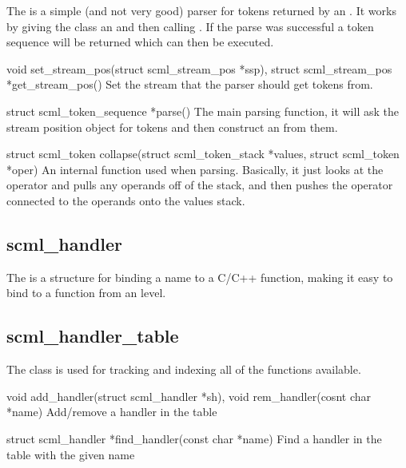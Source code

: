 The  is a simple (and not very good) parser for \SCML{} tokens
returned by an .  It works by giving the class an
 and then calling .  If the parse was
successful a token sequence will be returned which can then be executed.

\begin{cprototypelist}
  \item[void set_stream_pos(struct scml_stream_pos *ssp), struct
  scml_stream_pos *get_stream_pos()] Set the stream that the parser should get
  tokens from.

  \item[struct scml_token_sequence *parse()] The main parsing function, it will
  ask the stream position object for tokens and then construct an
   from them.

  \item[struct scml_token collapse(struct scml_token_stack *values,
  struct scml_token *oper)] An internal function used when parsing.  Basically,
  it just looks at the operator and pulls any operands off of the stack, and
  then pushes the operator connected to the operands onto the values stack.
\end{cprototypelist}

\subsection{scml\_handler}

The  is a structure for binding a name to a C/C++ function,
making it easy to bind to a function from an \SCML{} level.

\subsection{scml\_handler\_table}

The  class is used for tracking and indexing all of
the functions available.

\begin{cprototypelist}
  \item[void add_handler(struct scml_handler *sh),
		    void rem_handler(cosnt char *name)] Add/remove a handler
  in the table

  \item[struct scml_handler *find_handler(const char *name)] Find
  a handler in the table with the given name
\end{cprototypelist}

